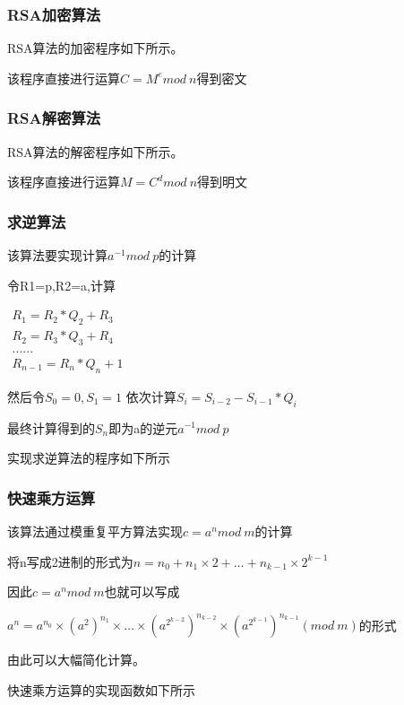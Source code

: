 \documentclass[a4paper,11pt,UTF8]{ctexart}
\begin{document}
        \subsubsection{RSA加密算法}
            RSA算法的加密程序如下所示。
            
            该程序直接进行运算$C=M^{e} mod\  n$得到密文
\newpage
        \subsubsection{RSA解密算法}
            RSA算法的解密程序如下所示。
            
            该程序直接进行运算$M=C^{d} mod\  n$得到明文

        \subsubsection{求逆算法}
            该算法要实现计算$a^{-1}mod\  p$的计算\par
            令R1=p,R2=a,计算\par
            $\begin{matrix}
                R_{1}=R_{2}*Q_{2}+R_{3}     \\ 
                R_{2}=R_{3}*Q_{3}+R_{4}      \\ 
                ......\\
                R_{n-1}=R_{n}*Q_{n}+1
            \end{matrix}$\par
            然后令$S_{0}=0,S_{1}=1$ 依次计算$ S_{i}=S_{i-2}-S_{i-1}*Q_{i}$\par
            最终计算得到的$S_{n}$即为a的逆元$a^{-1}mod\  p$\par
            实现求逆算法的程序如下所示
            
            
        \subsubsection{快速乘方运算}
            该算法通过模重复平方算法实现$c=a^{n}mod\  m$的计算\par
            将n写成2进制的形式为$n=n_{0}+n_{1}\times 2+\dots +n_{k-1}\times 2^{k-1}$\par
            因此$c=a^{n}mod\  m$也就可以写成\par
            $a^{n}=a^{n_{0}}\times (a^{2})^{n_{1}}\times \dots 
            \times (a^{2^{k-2}})^{n_{k-2}}\times (a^{2^{k-1}})^{n_{k-1}} (mod\ m)$的形式\par
            由此可以大幅简化计算。\par
            快速乘方运算的实现函数如下所示\par
            
\end{document}
